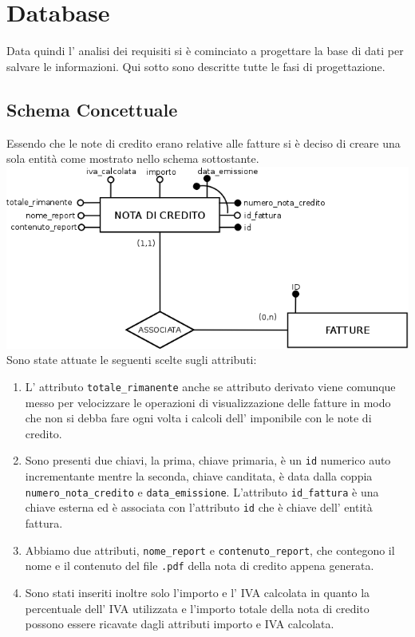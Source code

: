 \documentclass[12pt]{book}
\begin{document}
\section{Database}
Data quindi l' analisi dei requisiti si è cominciato a progettare la base di 
dati per salvare le informazioni.
Qui sotto sono descritte tutte le fasi di progettazione.
\subsection{Schema Concettuale}
Essendo che le note di credito erano relative alle fatture si è deciso di 
creare una sola entità come mostrato nello schema sottostante.
\newline
\newline
\includegraphics[scale=0.5]{img/schema_concettuale}
\newline
Sono state attuate le seguenti scelte sugli attributi:
\begin{enumerate}
    \item L' attributo \texttt{totale\_rimanente} anche se attributo 
        derivato viene comunque messo per velocizzare le operazioni di 
        visualizzazione delle fatture in modo che non si debba fare ogni volta 
        i calcoli dell’ imponibile con le note di credito.
    \item Sono presenti due chiavi, la prima, chiave primaria, è un \texttt{id} 
        numerico auto incrementante mentre la seconda, chiave canditata, è 
        data dalla coppia \texttt{numero\_nota\_credito} e 
        \texttt{data\_emissione}.
        L'attributo \texttt{id\_fattura} è una chiave esterna ed è associata 
        con l'attributo \texttt{id} che è chiave dell' entità fattura.
    \item Abbiamo due attributi, \texttt{nome\_report} e 
        \texttt{contenuto\_report}, che contegono il nome e il contenuto 
        del file \texttt{.pdf} della nota di credito appena generata.
    \item Sono stati inseriti inoltre solo l’importo e l’ IVA calcolata in 
        quanto la percentuale dell’ IVA utilizzata e l’importo totale della 
        nota di credito possono essere ricavate dagli attributi importo e 
        IVA calcolata.
\end{enumerate}
\end{document}
